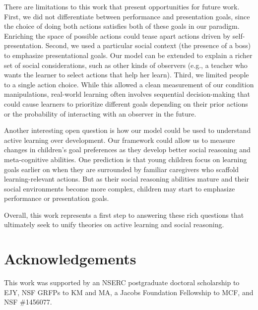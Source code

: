 \documentclass[10pt, letterpaper]{article}
\begin{document}
There are limitations to this work that present opportunities for future
work. First, we did not differentiate between performance and
presentation goals, since the choice of doing both actions satisfies
both of these goals in our paradigm. Enriching the space of possible
actions could tease apart actions driven by self-presentation. Second,
we used a particular social context (the presence of a boss) to
emphasize presentational goals. Our model can be extended to explain a
richer set of social considerations, such as other kinds of observers
(e.g., a teacher who wants the learner to select actions that help her
learn). Third, we limited people to a single action choice. While this
allowed a clean measurement of our condition manipulations, real-world
learning often involves sequential decision-making that could cause
learners to prioritize different goals depending on their prior actions
or the probability of interacting with an observer in the future.

Another interesting open question is how our model could be used to
understand active learning over development. Our framework could allow
us to measure changes in children's goal preferences as they develop
better social reasoning and meta-cognitive abilities. One prediction is
that young children focus on learning goals earlier on when they are
surrounded by familiar caregivers who scaffold learning-relevant
actions. But as their social reasoning abilities mature and their social
environments become more complex, children may start to emphasize
performance or presentation goals.

Overall, this work represents a first step to answering these rich
questions that ultimately seek to unify theories on active learning and
social reasoning.

\vspace{1em}
\vspace{1em} \noindent

\section{Acknowledgements}\label{acknowledgements}

This work was supported by an NSERC postgraduate doctoral scholarship to
EJY, NSF GRFPs to KM and MA, a Jacobs Foundation Fellowship to MCF, and
NSF \#1456077.
\end{document}
